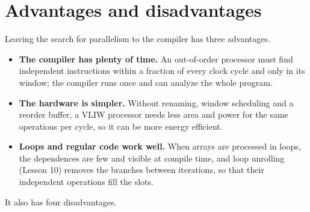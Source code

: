 \documentclass[../main.tex]{subfiles}
\begin{document}
\section{Advantages and disadvantages}
\label{sec:l11-good-bad}

Leaving the search for parallelism to the compiler has three
advantages.
\begin{itemize}
  \item \textbf{The compiler has plenty of time.}  An out-of-order processor
    must find independent instructions within a fraction of every clock cycle
    and only in its window; the compiler runs once and can analyze the whole
    program.
  \item \textbf{The hardware is simpler.}  Without renaming, window scheduling
    and a reorder buffer, a VLIW processor needs less area and power for the
    same operations per cycle, so it can be more energy efficient.
  \item \textbf{Loops and regular code work well.}  When arrays are processed
    in loops, the dependences are few and visible at compile time, and loop
    unrolling (Lesson 10) removes the branches between
    iterations, so that their independent operations fill the slots.
\end{itemize}
It also has four disadvantages.
\end{document}
